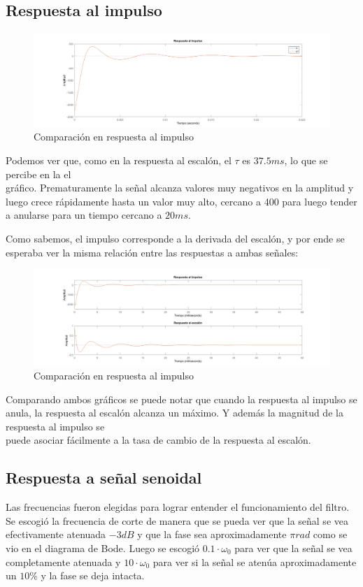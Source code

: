 \subsection{Respuesta al impulso}
\begin{figure}[H]
    \centering
    \includegraphics[width=1\textwidth]{resources/Comparacion_impulso.png}
    \caption{Comparación en respuesta al impulso}
\end{figure}
Podemos ver que, como en la respuesta al escalón, el $\tau$ es $37.5ms$, lo que se percibe en la el\\ gráfico. Prematuramente la señal alcanza valores muy negativos en la amplitud y luego crece rápidamente hasta un valor muy alto, cercano a 400 para luego tender a anularse para un tiempo cercano a $20ms$.

Como sabemos, el impulso corresponde a la derivada del escalón, y por ende se esperaba ver la misma relación entre las respuestas a ambas señales:

\begin{figure}[H]
    \centering
    \includegraphics[width=1\textwidth]{resources/impulso_escalon.png}
    \caption{Comparación en respuesta al impulso}
\end{figure}

Comparando ambos gráficos se puede notar que cuando la respuesta al impulso se anula, la respuesta al escalón alcanza un máximo. Y además la magnitud de la respuesta al impulso se\\ puede asociar fácilmente a la tasa de cambio de la respuesta al escalón.

\subsection{Respuesta a señal senoidal}
Las frecuencias fueron elegidas para lograr entender el funcionamiento del filtro. Se escogió la frecuencia de corte de manera que se pueda ver que la señal se vea efectivamente atenuada $-3dB$ y que la fase sea aproximadamente $\pi rad$ como se vio en el diagrama de Bode. Luego se escogió $0.1 \cdot \omega_0$ para ver que la señal se vea completamente atenuada y $10 \cdot \omega_0$ para ver si la señal se atenúa aproximadamente un $10\%$ y la fase se deja intacta.

